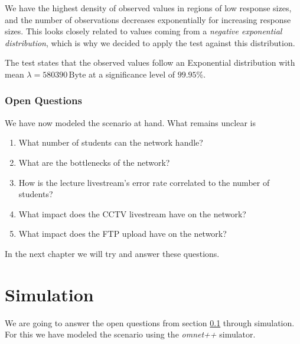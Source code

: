 \documentclass[a4paper]{scrreprt}
\begin{document}
		We have the highest density of observed values in regions of low response sizes, and the number of observations decreases exponentially for increasing response sizes. This looks closely related to values coming from a \emph{negative exponential distribution}, which is why we decided to apply the test against this distribution.
		
		The test states that the observed values follow an Exponential distribution with mean $\lambda=580390\,\text{Byte}$ at a significance level of $99.95\%$.
		
	\subsection{Open Questions}\label{sec:openquestions}
		We have now modeled the scenario at hand. What remains unclear is
		
		\begin{enumerate}
			\item What number of students can the network handle?
			\item What are the bottlenecks of the network?
			\item How is the lecture livestream's error rate correlated to the number of students?
			\item What impact does the CCTV livestream have on the network?
			\item What impact does the FTP upload have on the network?
		\end{enumerate}
		
		In the next chapter we will try and answer these questions.

\chapter{Simulation}
	We are going to answer the open questions from section \ref{sec:openquestions} through simulation. For this we have modeled the scenario using the \emph{omnet++} simulator.
	
\end{document}
